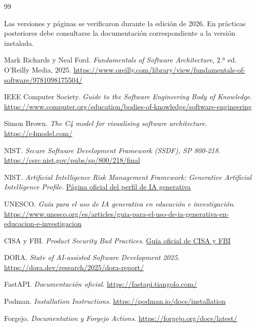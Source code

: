 \renewcommand{\bibname}{Referencias y recursos técnicos}
\begin{thebibliography}{99}

\item[] Las versiones y páginas se verificaron durante la edición de 2026. En prácticas posteriores debe consultarse la documentación correspondiente a la versión instalada.

Mark Richards y Neal Ford.
\emph{Fundamentals of Software Architecture}, 2.ª ed.
O'Reilly Media, 2025.
\url{https://www.oreilly.com/library/view/fundamentals-of-software/9781098175504/}

IEEE Computer Society.
\emph{Guide to the Software Engineering Body of Knowledge}.
\url{https://www.computer.org/education/bodies-of-knowledge/software-engineering}

Simon Brown.
\emph{The C4 model for visualising software architecture}.
\url{https://c4model.com/}

NIST.
\emph{Secure Software Development Framework (SSDF), SP 800-218}.
\url{https://csrc.nist.gov/pubs/sp/800/218/final}

NIST.
\emph{Artificial Intelligence Risk Management Framework: Generative Artificial Intelligence Profile}.
\href{https://www.nist.gov/publications/artificial-intelligence-risk-management-framework-generative-artificial-intelligence}{Página oficial del perfil de IA generativa}

UNESCO.
\emph{Guía para el uso de IA generativa en educación e investigación}.
\url{https://www.unesco.org/es/articles/guia-para-el-uso-de-ia-generativa-en-educacion-e-investigacion}

CISA y FBI.
\emph{Product Security Bad Practices}.
\href{https://www.cisa.gov/news-events/alerts/2025/01/17/cisa-and-fbi-release-updated-guidance-product-security-bad-practices}{Guía oficial de CISA y FBI}

DORA.
\emph{State of AI-assisted Software Development 2025}.
\url{https://dora.dev/research/2025/dora-report/}

FastAPI.
\emph{Documentación oficial}.
\url{https://fastapi.tiangolo.com/}

Podman.
\emph{Installation Instructions}.
\url{https://podman.io/docs/installation}

Forgejo.
\emph{Documentation y Forgejo Actions}.
\url{https://forgejo.org/docs/latest/}


\end{thebibliography}
